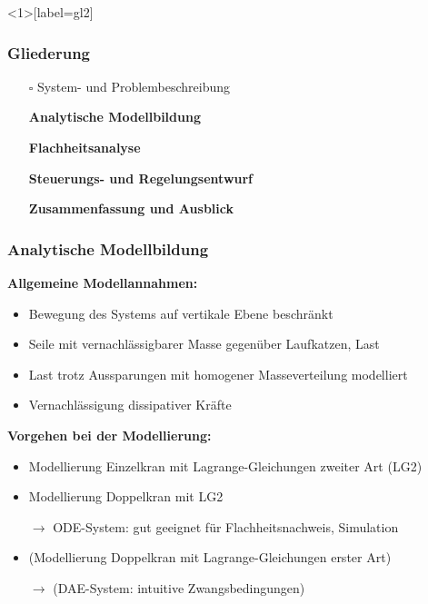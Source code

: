 \documentclass[
	ngerman,
	10pt,				%
	aspectratio=169, 	%
	xcolor=dvipsnames
]{beamer}
\newcommand{\cdbox}{$\square$\hspace{-0.65em}\raisebox{0.1em}{\checkmark}\hspace{-0.18em}}
\begin{document}

\begin{frame}<1>[label=gl2]
	\frametitle{Gliederung}
	\begin{itemize}
		\item[\cdbox] System- und Problembeschreibung
		\item[\only<1>{$\rightarrow$}\only<2>{$\rightarrow$}\only<3->{\cdbox}]
		\textbf<1>{Analytische Modellbildung}
		\item[\only<1>{$\square$}\only<2>{$\rightarrow$}\only<3->{\cdbox}]
		\textbf<2>{Flachheitsanalyse}
		\item[\only<1-2>{$\square$}\only<3>{$\rightarrow$}\only<4->{\cdbox}]
		\textbf<3>{Steuerungs- und Regelungsentwurf}
		\item[\only<1-2>{$\square$}\only<3>{$\rightarrow$}\only<4->{\cdbox}]
		\textbf<3>{Zusammenfassung und Ausblick}
	\end{itemize}
\end{frame}


\begin{frame}[label=analMB]
	\frametitle{Analytische Modellbildung}
	\textbf{Allgemeine Modellannahmen:}
	\begin{itemize}
		\item Bewegung des Systems auf vertikale Ebene beschränkt
		\pause
		\item Seile mit vernachlässigbarer Masse gegenüber Laufkatzen, Last
		\pause
		\item Last trotz Aussparungen mit homogener Masseverteilung modelliert
		\pause
		\item Vernachlässigung dissipativer Kräfte 
	\end{itemize}

	\pause
	\bigskip
	\textbf{Vorgehen bei der Modellierung:}
	\begin{itemize}
		\item Modellierung Einzelkran mit Lagrange-Gleichungen zweiter Art (LG2)
		\pause
		\item Modellierung Doppelkran mit LG2
		\pause
		\item[$\rightarrow$] ODE-System: gut geeignet für Flachheitsnachweis, Simulation 
		\pause
		\item (Modellierung Doppelkran mit Lagrange-Gleichungen erster Art)
		\item[$\rightarrow$] (DAE-System: intuitive Zwangsbedingungen)
	\end{itemize}
\end{frame}
\end{document}
